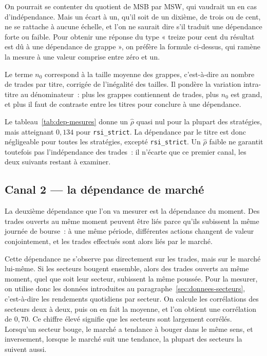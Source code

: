 On pourrait se contenter du quotient de MSB par MSW, qui vaudrait un en
cas d'indépendance. Mais un écart à un, qu'il soit de un dixième, de
trois ou de cent, ne se rattache à aucune échelle, et l'on ne saurait
dire s'il traduit une dépendance forte ou faible. Pour obtenir une
réponse du type « treize pour cent du résultat est dû à une dépendance
de grappe », on préfère la formule ci-dessus, qui ramène la mesure à une
valeur comprise entre zéro et un.

Le terme $n_0$ correspond à la taille moyenne des grappes, c'est-à-dire
au nombre de trades par titre, corrigée de l'inégalité des tailles. Il
pondère la variation intra-titre au dénominateur~: plus les grappes
contiennent de trades, plus $n_0$ est grand, et plus il faut de
contraste entre les titres pour conclure à une dépendance.

Le tableau~\ref{tab:dep-mesures} donne un $\hat\rho$ quasi nul pour la
plupart des stratégies, mais atteignant $0{,}134$ pour
\texttt{rsi\_strict}. La dépendance par le titre est donc négligeable
pour toutes les stratégies, excepté \texttt{rsi\_strict}. Un $\hat\rho$
faible ne garantit toutefois pas l'indépendance des trades~: il n'écarte
que ce premier canal, les deux suivants restant à examiner.

\subsection{Canal 2 --- la dépendance de marché}
\label{sec:dep-canal2}

La deuxième dépendance que l'on va mesurer est la dépendance du moment.
Des trades ouverts au même moment peuvent être liés parce qu'ils
subissent la même journée de bourse~: à une même période, différentes
actions changent de valeur conjointement, et les trades effectués sont
alors liés par le marché.

Cette dépendance ne s'observe pas directement sur les trades, mais sur
le marché lui-même. Si les secteurs bougent ensemble, alors des trades
ouverts au même moment, quel que soit leur secteur, subissent la même
poussée. Pour la mesurer, on utilise donc les données introduites au
paragraphe~\ref{sec:donnees-secteurs}, c'est-à-dire les rendements
quotidiens par secteur. On calcule les corrélations des secteurs deux à
deux, puis on en fait la moyenne, et l'on obtient une corrélation de
$0{,}70$. Ce chiffre élevé signifie que les secteurs sont largement
corrélés. Lorsqu'un secteur bouge, le marché a tendance à bouger dans le
même sens, et inversement, lorsque le marché suit une tendance, la
plupart des secteurs la suivent aussi.

